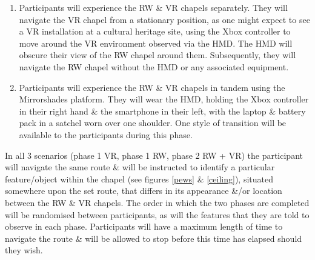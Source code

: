 \documentclass[oneside]{book}
\begin{document}
\begin{enumerate}
	\item Participants will experience the RW \& VR chapels separately. They will navigate the VR chapel from a stationary position, as one might expect to see a VR installation at a cultural heritage site, using the Xbox controller to move around the VR environment observed via the HMD. The HMD will obscure their view of the RW chapel around them. Subsequently, they will navigate the RW chapel without the HMD or any associated equipment.
	\item Participants will experience the RW \& VR chapels in tandem using the Mirrorshades platform. They will wear the HMD, holding the Xbox controller in their right hand \& the smartphone in their left, with the laptop \& battery pack in a satchel worn over one shoulder. One style of transition will be available to the participants during this phase.
\end{enumerate}

In all 3 scenarios (phase 1 VR, phase 1 RW, phase 2 RW + VR) the participant will navigate the same route \& will be instructed to identify a particular feature/object within the chapel (see figures \ref{pews} \& \ref{ceiling}), situated somewhere upon the set route, that differs in its appearance \&/or location between the RW \& VR chapels. The order in which the two phases are completed will be randomised between participants, as will the features that they are told to observe in each phase. Participants will have a maximum length of time to navigate the route \& will be allowed to stop before this time has elapsed should they wish.



\end{document}
